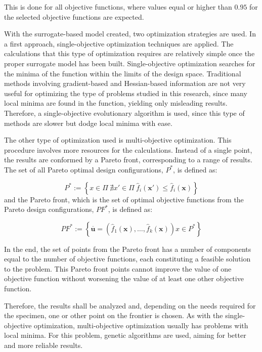 \documentclass[cmfonts]{witpress}
\begin{document}
This is done for all objective functions, where values equal or higher than $0.95$ for the selected objective functions are expected. 

With the surrogate-based model created, two optimization strategies are used. In a first approach, single-objective optimization techniques are applied. The calculations that this type of optimization requires are relatively simple once the proper surrogate model has been built. Single-objective optimization searches for the minima of the function within the limits of the design space. Traditional methods involving gradient-based and Hessian-based information are not very useful for optimizing the type of problems studied in this research, since many local minima are found in the function, yielding only misleading results. Therefore, a single-objective evolutionary algorithm is used, since this type of methods are slower but dodge local minima with ease.

The other type of optimization used is multi-objective optimization. This procedure involves more resources for the calculations. Instead of a single point, the results are conformed by a Pareto front, corresponding to a range of results. The set of all Pareto optimal design configurations, $P^*$, is defined as:

\begin{equation}
P^* := \left\{ x \in \Pi \   \nexists x' \in \Pi \    \hat{f}_i \left( \bm{x'} \right) \leqslant \hat{f}_i \left( \bm{x} \right)  \right\}
\end{equation}
and the Pareto front, which is the set of optimal objective functions from the Pareto design configurations, $PF^*$, is defined as:

\begin{equation}
PF^* := \left\{ \overline{\bm{u}} = \left( \hat{f}_1 \left( \bm{x} \right), \ldots , \hat{f}_k \left( \bm{x} \right) \right)  x \in P^* \right\}
\end{equation}

In the end, the set of points from the Pareto front has a number of components equal to the number of objective functions, each constituting a feasible solution to the problem. This Pareto front points cannot improve the value of one objective function without worsening the value of at least one other objective function.

Therefore, the results shall be analyzed and, depending on the needs required for the specimen, one or other point on the frontier is chosen. As with the single-objective optimization, multi-objective optimization usually has problems with local minima. For this problem, genetic algorithms are used, aiming for better and more reliable results.
\end{document}
